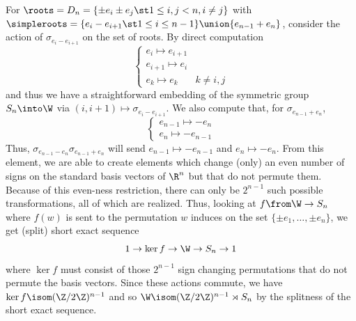 \documentclass[11pt,leqno,oneside]{amsart}
\numberwithin{thm}{section}
\begin{document}
\begin{example}
  For \(\roots = D_n = \{\pm e_i \pm e_j \st 1 \leq i,j < n, i \neq
  j\}\) with \(\simpleroots = \{e_i-e_{i+1} \st 1 \leq i \leq n-1\}
  \union \{e_{n-1}+e_n\}\), consider the action of
  \(\sigma_{e_i-e_{i+1}}\) on the set of roots. By 
  direct computation \[
    \begin{cases}
      e_i \mapsto e_{i+1} \\
      e_{i+1} \mapsto e_i \\
      e_k \mapsto e_k & k \neq i,j
    \end{cases} %
  \]
  and thus we have a straightforward embedding of the symmetric group
  \(S_n \into \W\) via \((i,i+1) \mapsto \sigma_{e_i-e_{i+1}}\). 
  We also compute that, for \(\sigma_{e_{n-1}+e_n}\), \[
    \begin{cases}
      e_{n-1} \mapsto -e_n \\
      e_n \mapsto -e_{n-1}
    \end{cases} %
  \]
  Thus, \(\sigma_{e_{n-1}-e_n}\sigma_{e_{n-1}+e_n}\) will send
  \(e_{n-1} \mapsto -e_{n-1}\) and \(e_n \mapsto -e_n\). From this
  element, we are able to create elements which change (only) an even
  number of signs on the standard basis vectors of \(\R^n\) but that do not
  permute them. Because of this even-ness restriction, there can only
  be \(2^{n-1}\) such possible transformations, all of which are
  realized. Thus, looking at \(f \from \W \to S_n\) where \(f(w)\) is
  sent to the permutation \(w\) induces on the set \(\{\pm
  e_1, \ldots, \pm e_n\}\), we get (split) short exact sequence \[
    1 \to \ker f \to \W \to S_n \to 1
  \]
  where \(\ker f\) must consist of those \(2^{n-1}\) sign changing
  permutations that do not permute the basis vectors. Since these
  actions commute, we have \(\ker f \isom (\Z/2\Z)^{n-1}\) and so \(\W
  \isom (\Z/2\Z)^{n-1} \rtimes S_n\) by the splitness of the short
  exact sequence.
\end{example}
\end{document}
